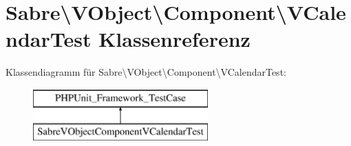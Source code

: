 \hypertarget{class_sabre_1_1_v_object_1_1_component_1_1_v_calendar_test}{}\section{Sabre\textbackslash{}V\+Object\textbackslash{}Component\textbackslash{}V\+Calendar\+Test Klassenreferenz}
\label{class_sabre_1_1_v_object_1_1_component_1_1_v_calendar_test}
Klassendiagramm für Sabre\textbackslash{}V\+Object\textbackslash{}Component\textbackslash{}V\+Calendar\+Test\+:\begin{figure}[H]
\begin{center}
\leavevmode
\includegraphics[height=2.000000cm]{class_sabre_1_1_v_object_1_1_component_1_1_v_calendar_test}
\end{center}
\end{figure}

